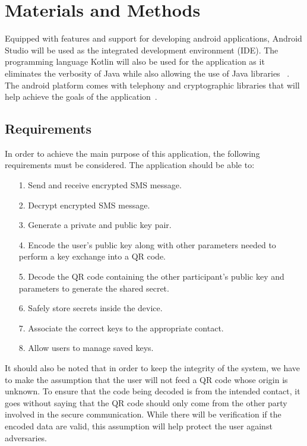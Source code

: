 \documentclass[journal]{./IEEE/IEEEtran}
\begin{document}
\section{Materials and Methods}
Equipped with features and support for developing android applications,
Android Studio will be used as the integrated development environment (IDE).
The programming language Kotlin will also be used for the application as it
eliminates the verbosity of Java while also allowing the use of Java libraries
~\cite{Moskala_Wojda_2017}. The android platform comes with telephony and 
cryptographic libraries that will help achieve the goals of the 
application~\cite{android_pkg}.

\subsection{Requirements}
In order to achieve the main purpose of this application, the following
requirements must be considered. The application should be able to:
\begin{itemize}
    \item[1.] Send and receive encrypted SMS message.
    \item[2.] Decrypt encrypted SMS message.
    \item[3.] Generate a private and public key pair.
    \item[4.] Encode the user's public key along with other parameters
        needed to perform a key exchange into a QR code.
    \item[5.] Decode the QR code containing the other participant's public
        key and parameters to generate the shared secret.
    \item[6.] Safely store secrets inside the device.
    \item[7.] Associate the correct keys to the appropriate contact.
    \item[8.] Allow users to manage saved keys.
\end{itemize}

It should also be noted that in order to keep the integrity of the system,
we have to make the assumption that the user will not feed a QR code
whose origin is unknown. To ensure that the code being decoded is from the 
intended contact, it goes without saying that the QR code should only come
from the other party involved in the secure communication. 
While there will be verification if the encoded data
are valid, this assumption will help protect the user against adversaries.
\end{document}
